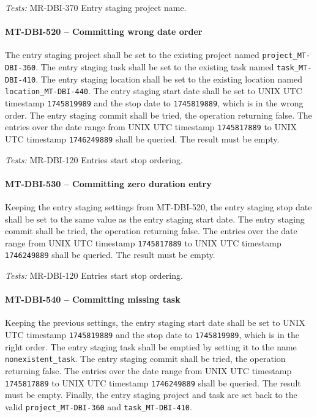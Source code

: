 \textit{Tests: } MR-DBI-370 Entry staging project name.

\paragraph{MT-DBI-520 -- Committing wrong date order}
The entry staging project shall be set to the existing project named
\lstinline{project_MT-DBI-360}. The entry staging task shall be
set to the existing task named \lstinline{task_MT-DBI-410}.
The entry staging location shall be set to the existing
location named \lstinline{location_MT-DBI-440}.
The entry staging start date shall be set to UNIX UTC timestamp
\lstinline{1745819989} and the stop date to
\lstinline{1745819889}, which is in the wrong order.
The entry staging commit shall be tried, the operation returning
false.
The entries over the date range from UNIX UTC timestamp \lstinline{1745817889}
to UNIX UTC timestamp \lstinline{1746249889} shall be queried. The result must
be empty.

\textit{Tests: } MR-DBI-120 Entries start stop ordering.

\paragraph{MT-DBI-530 -- Committing zero duration entry}
Keeping the entry staging settings from MT-DBI-520,
the entry staging stop date shall be set to the same value as
the entry staging start date.
The entry staging commit shall be tried, the operation returning false.
The entries over the date range from UNIX UTC timestamp \lstinline{1745817889}
to UNIX UTC timestamp \lstinline{1746249889} shall be queried. The result must
be empty.

\textit{Tests: } MR-DBI-120 Entries start stop ordering.

\paragraph{MT-DBI-540 -- Committing missing task}
Keeping the previous settings,
the entry staging start date shall be set to UNIX UTC timestamp
\lstinline{1745819889} and the stop date to
\lstinline{1745819989}, which is in the right order.
The entry staging task shall be emptied by setting it to
the name \lstinline{nonexistent_task}.
The entry staging commit shall be tried, the operation returning false.
The entries over the date range from UNIX UTC timestamp \lstinline{1745817889}
to UNIX UTC timestamp \lstinline{1746249889} shall be queried. The result must
be empty. Finally, the entry staging project and task are set back to the valid
\lstinline{project_MT-DBI-360} and \lstinline{task_MT-DBI-410}.

